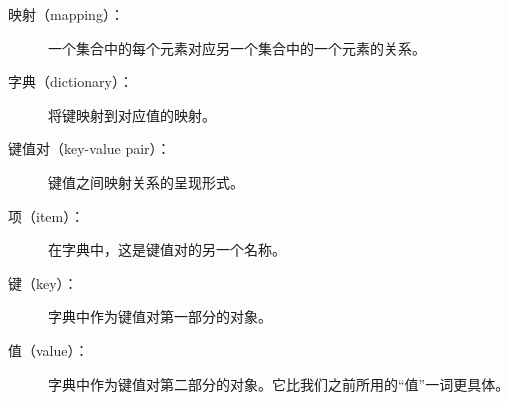\begin{description}


\item[映射（mapping）：] 一个集合中的每个元素对应另一个集合中的一个元素的关系。



\item[字典（dictionary）：] 将键映射到对应值的映射。



\item[键值对（key-value pair）：] 键值之间映射关系的呈现形式。



\item[项（item）：] 在字典中，这是键值对的另一个名称。



\item[键（key）：] 字典中作为键值对第一部分的对象。


\item[值（value）：] 字典中作为键值对第二部分的对象。它比我们之前所用的``值''一词更具体。




\end{description}
